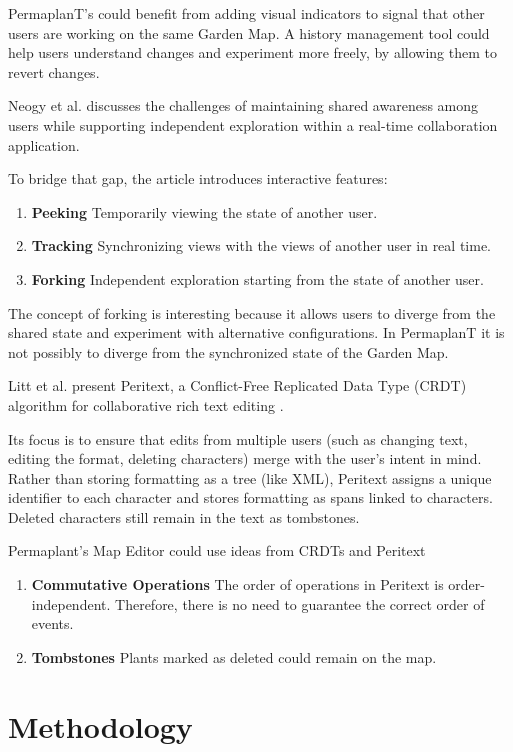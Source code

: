 \documentclass[final,oneside]{vutinfth}
\begin{document}
PermaplanT's could benefit from adding visual indicators to signal that other users are working on the same Garden Map.
A history management tool could help users understand changes and experiment more freely, by allowing them to revert changes.

Neogy et al. discusses the challenges of maintaining shared awareness among users while supporting independent exploration within a real-time collaboration application. \cite{collaboration_visualizations} 

To bridge that gap, the article introduces interactive features:
\begin{enumerate}
    \item \textbf{Peeking} Temporarily viewing the state of another user.
    \item \textbf{Tracking} Synchronizing views with the views of another user in real time.
    \item \textbf{Forking} Independent exploration starting from the state of another user.
\end{enumerate}

The concept of forking is interesting because it allows users to diverge from the shared state and experiment with alternative configurations.
In PermaplanT it is not possibly to diverge from the synchronized state of the Garden Map.

Litt et al. present Peritext, a Conflict-Free Replicated Data Type (CRDT) algorithm for collaborative rich text editing \cite{peritext}.

Its focus is to ensure that edits from multiple users (such as changing text, editing the format, deleting characters) merge with the user's intent in mind.
Rather than storing formatting as a tree (like XML), Peritext assigns a unique identifier to each character and stores formatting as spans linked to characters.
Deleted characters still remain in the text as tombstones.

Permaplant's Map Editor could use ideas from CRDTs and Peritext
\begin{enumerate}
    \item \textbf{Commutative Operations} The order of operations in Peritext is order-independent.
    Therefore, there is no need to guarantee the correct order of events.
    \item \textbf{Tombstones} Plants marked as deleted could remain on the map.
\end{enumerate}

\chapter{Methodology}
\end{document}
